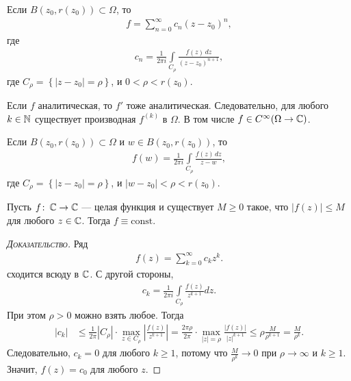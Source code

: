 
\begin{crly}
 Если $ B(z_0, r(z_0)) \subset \Omega $, то
 \begin{align*}
  f = \sum_{n=0}^{\infty}c_n(z-z_0)^{n},
 \end{align*} где
 \begin{align*}
  c_n = \frac{1}{2\pi i} \int\limits_{C_\rho} \frac{f(z)\,dz}{(z-z_0)^{n+1}},
 \end{align*} где $ C_\rho = \left\{ \left| z-z_0 \right| = \rho \right\} $, и $ 0 < \rho < r(z_0) $.
\end{crly}
\begin{crly}
 Если $ f $ аналитическая, то $ f' $ тоже аналитическая. Следовательно, для любого $ k \in \mathbb{N} $ существует производная $ f^{(k)} $ в $ \Omega $. В том числе $ f \in C^{\infty}(\Omega \to \mathbb{C}) $.
\end{crly}
\begin{crly}
 Если $ B(z_0, r(z_0)) \subset \Omega $ и $ w \in B(z_0,r(z_0)) $, то
 \begin{align*}
  f(w) = \frac{1}{2\pi i} \int\limits_{C_\rho} \frac{f(z)\,dz}{z - w},
 \end{align*} где $ C_\rho = \left\{ \left| z-z_0 \right| = \rho \right\} $, и $ \left| w - z_0 \right| < \rho < r(z_0) $.
\end{crly}

\begin{thm}[Лиувилля]
 \label{theorem:liuvill}
 Пусть $ f \colon\, \mathbb{C} \to \mathbb{C} $ --- целая функция и существует $ M \geq 0 $ такое, что $ \left| f(z) \right| \leqslant M $ для любого $ z \in \mathbb{C} $. Тогда $ f \equiv \mathrm{const} $.
\end{thm}
\begin{proof}[\normalfont\textsc{Доказательство}]
 Ряд
 \begin{align*}
  f(z) = \sum_{k=0}^{\infty} c_k z^{k}.
 \end{align*} сходится всюду в $ \mathbb{C} $. С другой стороны,
 \begin{align*}
  c_k = \frac{1}{2\pi i} \int\limits_{C_\rho} \frac{f(z)}{z^{k+1}} dz.
 \end{align*} При этом $ \rho > 0 $ можно взять любое. Тогда
 \begin{align*}
  \left| c_k \right| &\leqslant \frac{1}{2\pi} \left| C_\rho \right| \cdot \max_{z \in C_\rho} \left| \frac{f(z)}{z^{k+1}} \right| = \frac{2\pi \rho}{2\pi}  \cdot \max_{\left| z \right|=\rho} \frac{\left| f(z) \right|}{\left| z \right|^{k+1}} \leqslant \rho \frac{M}{\rho^{k+1}} = \frac{M}{\rho^{k}}.
 \end{align*} Следовательно, $ c_k = 0 $ для любого $ k \geqslant 1 $, потому что $ \frac{M}{\rho^{k}} \to 0 $ при $ \rho \to \infty $ и $ k \geqslant 1 $. Значит, $ f(z) = c_0 $ для любого $ z $.
\end{proof}

